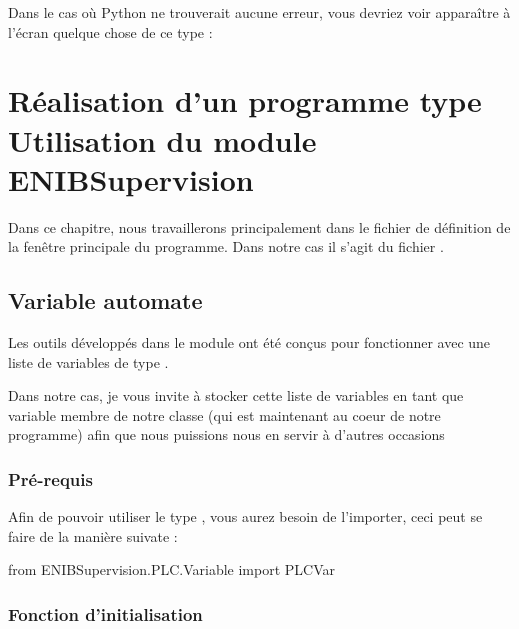 \documentclass[12pt]{report}    %
\begin{document}
\smallSkip

Dans le cas où Python ne trouverait aucune erreur, vous devriez voir apparaître à l'écran quelque chose de ce type :






\chapter{Réalisation d'un programme type\protect\\Utilisation du module ENIBSupervision}

Dans ce chapitre, nous travaillerons principalement dans le fichier de définition de la fenêtre principale du programme. Dans notre cas il s'agit du fichier .\smallSkip




\section{Variable automate}

Les outils développés dans le module  ont été conçus pour fonctionner avec une liste de variables de type .\smallSkip

Dans notre cas, je vous invite à stocker cette liste de variables en tant que variable membre de notre classe  (qui est maintenant au coeur de notre programme) afin que nous puissions nous en servir à d'autres occasions

\subsection{Pré-requis}

Afin de pouvoir utiliser le type , vous aurez besoin de l'importer, ceci peut se faire de la manière suivate :
\begin{pyCode}
from ENIBSupervision.PLC.Variable import PLCVar
\end{pyCode}

\subsection{Fonction d'initialisation}
\end{document}
